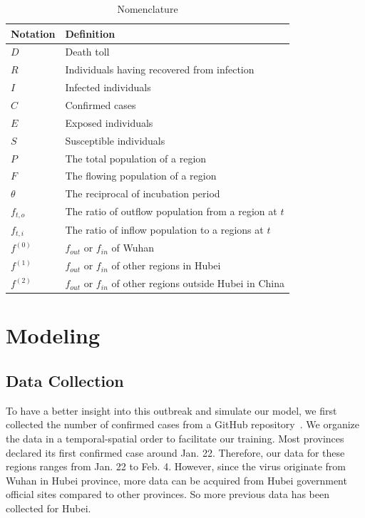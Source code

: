 \documentclass[12pt]{mcmthesis}
\begin{document}
\linespread{1.0}
\begin{table}[H]
    \centering
    \caption{Nomenclature}
    \label{tab:Nomen}
    \begin{tabular}{p{4cm}p{10cm}}
    \hline
    Notation & Definition \\
    
    \hline
    $D$ & Death toll \\
    $R$ & Individuals having recovered from infection \\
    $I$ & Infected individuals \\
    $C$ & Confirmed cases  \\
    $E$ & Exposed individuals \\
    $S$ & Susceptible individuals \\
    $P$ & The total population of a region \\
    $F$ & The flowing population of a region \\
    $\theta$ & The reciprocal of incubation period \\
    $f_{t,o}$ & The ratio of outflow population from a region at $t$ \\
    $f_{t,i}$ & The ratio of inflow population to a regions at $t$ \\
    $f^{(0)}$ & $f_{out}$ or $f_{in}$ of Wuhan \\
    $f^{(1)}$ & $f_{out}$ or $f_{in}$ of other regions in Hubei \\
    $f^{(2)}$ & $f_{out}$ or $f_{in}$ of other regions outside Hubei in China \\
    
    \hline
    \end{tabular}
    \label{tab:notation}
\end{table}
\linespread{0.6}

\section{Modeling} \label{Sec:Modeling}
\subsection{Data Collection}

To have a better insight into this outbreak and simulate our model, we first collected the number of confirmed cases from a GitHub repository~\cite{data_github}. We organize the data in a temporal-spatial order to facilitate our training. Most provinces declared its first confirmed case around Jan. 22. Therefore, our data for these regions ranges from Jan. 22 to Feb. 4. However, since the virus originate from Wuhan in Hubei province, more data can be acquired from Hubei government official sites compared to other provinces. So more previous data has been collected for Hubei.
\end{document}
